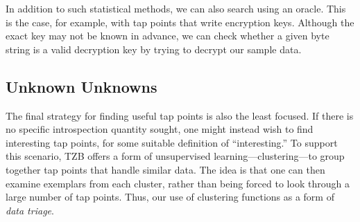 In addition to such statistical methods, we can also
search using an oracle.  
This is the case, for example, with tap points
that write encryption keys.
Although the exact key may not be known in
advance, we can check whether a given byte string is a valid
decryption key by trying to decrypt our sample data.



\subsection{Unknown Unknowns}

The final strategy for finding useful tap points is also the least
focused. If there is no specific introspection quantity sought, one
might instead wish to find interesting tap points, for some suitable
definition of ``interesting.'' To support this scenario, TZB offers a
form of unsupervised learning---clustering---to group together tap
points that handle similar data. The idea is that one can then examine
exemplars from each cluster, rather than being forced to look through a
large number of tap points. Thus, our use of clustering functions as a
form of \emph{data triage}.
